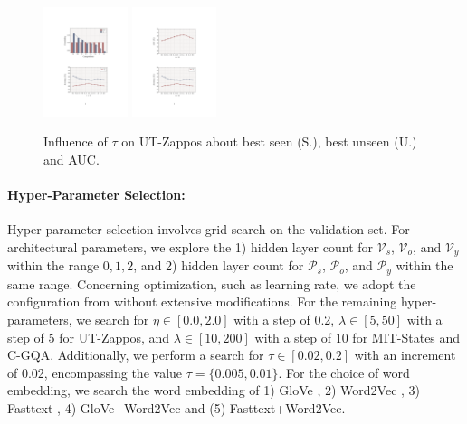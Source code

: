 \documentclass[letterpaper]{article} %
\theoremstyle{definition}
\begin{document}
 
  \begin{figure}[t]
	\centering
		\subfigure
		{
			\includegraphics[width=0.22\textwidth]{ FIG_HYPER_5.pdf}
		}
  		\subfigure
		{
			\includegraphics[width=0.22\textwidth]{ FIG_HYPER_6.pdf}
		}
	\caption{Influence of $\tau$ on UT-Zappos about best seen (S.), best unseen (U.) and AUC.}
	\label{subfig_hyper}
 \vspace{-2.5ex}
\end{figure}
 
\paragraph{Hyper-Parameter Selection:} 
Hyper-parameter selection involves grid-search on the validation set. For architectural parameters, we explore the 1) hidden layer count for $\mathcal{V}_{s}$, $\mathcal{V}_{o}$, and $\mathcal{V}_{y}$ within the range ${0,1,2}$, and 2) hidden layer count for $\mathcal{P}_{s}$, $\mathcal{P}_{o}$, and $\mathcal{P}_{y}$ within the same range. Concerning optimization, such as learning rate, we adopt the configuration from \citet{naeem2021learning} without extensive modifications. For the remaining hyper-parameters, we search for $\eta\in [0.0,2.0]$ with a step of 0.2, $\lambda \in [5,50]$ with a step of 5 for UT-Zappos, and $\lambda \in [10,200]$ with a step of 10 for MIT-States and C-GQA. Additionally, we perform a search for $\tau \in [0.02,0.2]$ with an increment of 0.02, encompassing the value $\tau=\{0.005,0.01\}$. For the choice of word embedding, we search the word embedding of 1) GloVe \cite{glove}, 2) Word2Vec \cite{mikolov2013distributed}, 3) Fasttext \cite{fasttext}, 4) GloVe+Word2Vec and (5) Fasttext+Word2Vec.
\end{document}
